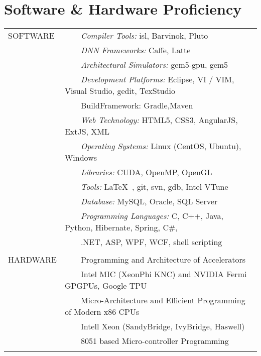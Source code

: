 \documentclass[a4paper,10pt]{article} %
\newcommand{\tabitem}{~~\llap{\textbullet}~~}
\begin{document}
\section{Software \& Hardware Proficiency}
\begin{tabular}{p{3cm}l}
SOFTWARE & \tabitem \textit{Compiler Tools:} isl, Barvinok, Pluto\\
& \tabitem \textit{DNN Frameworks:} Caffe, Latte\\
& \tabitem \textit{Architectural Simulators:} gem5-gpu, gem5\\
& \tabitem \textit{Development Platforms:} Eclipse, VI / VIM, Visual Studio, gedit, TexStudio\\
& \tabitem{BuildFramework:} Gradle,Maven \\
& \tabitem \textit{Web Technology:} HTML5, CSS3, AngularJS, ExtJS, XML\\
& \tabitem \textit{Operating Systems:} Linux (CentOS, Ubuntu), Windows \\
& \tabitem \textit{Libraries:} CUDA, OpenMP, OpenGL  \\
& \tabitem \textit{Tools:} \LaTeX\ , git, svn, gdb, Intel VTune\\
& \tabitem \textit{Database:} MySQL, Oracle, SQL Server\\
& \tabitem \textit{Programming Languages:} C, C++, Java, Python, Hibernate, Spring, C\#, \\
& ~~~~.NET, ASP, WPF, WCF, shell scripting\\

&\\

HARDWARE  & \tabitem Programming and Architecture of Accelerators \\
& ~~~~Intel MIC (XeonPhi KNC) and NVIDIA Fermi GPGPUs, Google TPU \\
& \tabitem Micro-Architecture and Efficient Programming of Modern x86 CPUs\\
& ~~~~Intell Xeon (SandyBridge, IvyBridge, Haswell) \\ 
& \tabitem 8051 based Micro-controller Programming \\
&\\
\end{tabular}
\\
\\

\end{document}
